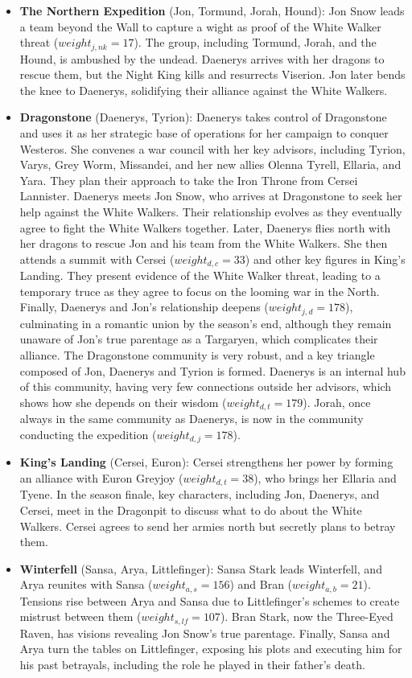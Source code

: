 \documentclass[10pt,twocolumn,letterpaper]{article}
\begin{document}
\begin{itemize}
    \item \textbf{The Northern Expedition} (Jon, Tormund, Jorah, Hound): Jon Snow leads a team beyond the Wall to capture a wight as proof of the White Walker threat ($weight_{j,nk}=17$). The group, including Tormund, Jorah, and the Hound, is ambushed by the undead. Daenerys arrives with her dragons to rescue them, but the Night King kills and resurrects Viserion. Jon later bends the knee to Daenerys, solidifying their alliance against the White Walkers.
    \item \textbf{Dragonstone} (Daenerys, Tyrion): Daenerys takes control of Dragonstone and uses it as her strategic base of operations for her campaign to conquer Westeros. She convenes a war council with her key advisors, including Tyrion, Varys, Grey Worm, Missandei, and her new allies Olenna Tyrell, Ellaria, and Yara. They plan their approach to take the Iron Throne from Cersei Lannister. Daenerys meets Jon Snow, who arrives at Dragonstone to seek her help against the White Walkers. Their relationship evolves as they eventually agree to fight the White Walkers together. Later, Daenerys flies north with her dragons to rescue Jon and his team from the White Walkers. She then attends a summit with Cersei ($weight_{d,c}=33$) and other key figures in King's Landing. They present evidence of the White Walker threat, leading to a temporary truce as they agree to focus on the looming war in the North. Finally, Daenerys and Jon's relationship deepens ($weight_{j,d}=178$), culminating in a romantic union by the season’s end, although they remain unaware of Jon's true parentage as a Targaryen, which complicates their alliance. The Dragonstone community is very robust, and a key triangle composed of Jon, Daenerys and Tyrion is formed. Daenerys is an internal hub of this community, having very few connections outside her advisors, which shows how she depends on their wisdom ($weight_{d,t}=179$). Jorah, once always in the same community as Daenerys, is now in the community conducting the expedition ($weight_{d,j}=178$).
    \item \textbf{King's Landing} (Cersei, Euron): Cersei strengthens her power by forming an alliance with Euron Greyjoy ($weight_{d,t}=38$), who brings her Ellaria and Tyene. In the season finale, key characters, including Jon, Daenerys, and Cersei, meet in the Dragonpit to discuss what to do about the White Walkers. Cersei agrees to send her armies north but secretly plans to betray them.
    \item \textbf{Winterfell} (Sansa, Arya, Littlefinger): Sansa Stark leads Winterfell, and Arya reunites with Sansa ($weight_{a,s}=156$) and Bran ($weight_{a,b}=21$). Tensions rise between Arya and Sansa due to Littlefinger's schemes to create mistrust between them ($weight_{s,lf}=107$). Bran Stark, now the Three-Eyed Raven, has visions revealing Jon Snow’s true parentage. Finally, Sansa and Arya turn the tables on Littlefinger, exposing his plots and executing him for his past betrayals, including the role he played in their father's death.
\end{itemize}
\end{document}
